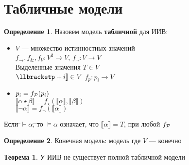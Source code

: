 \documentclass[oneside]{book}
\theoremstyle{plain}
\theoremstyle{remark}
\theoremstyle{definition}
\newtheorem{theorem}{Теорема}[section]
\newtheorem*{definition}{Определение}
\begin{document}
\section{Табличные модели}
\label{sec:org0a7f6ba}
\begin{definition}
Назовем модель \textbf{табличной} для ИИВ:
\begin{itemize}
\item \(V\) --- множество истинностных значений \\
\(f_\to,f_\&, f_V: V^2 \to V\), \(f_\neg: V \to V\) \\
Выделенные значения \(T \in V\) \\
\(\llbracketp+i\rrbracket \in V\) \(f_p : p_i \to V\)
\item \(p_i = f_\P(p_i)\) \\
\(\llbracket\alpha \star \beta\rrbracket = f_\star(\llbracket\alpha\rrbracket, \llbracket\beta\rrbracket)\) \\
\(\llbracket\neg \alpha\rrbracket = f_\neg(\llbracket\alpha\rrbracket)\)
\end{itemize}
\sout{Если \(\vdash \alpha\), то} \(\vDash \alpha\) означает, что \(\llbracket\alpha\rrbracket = T\), при любой \(f_\P\)
\end{definition}
\begin{definition}
Конечная модель: модель где \(V\) --- конечно
\end{definition}
\begin{theorem}
У ИИВ не существует полной табличной модели
\end{theorem}
\end{document}
